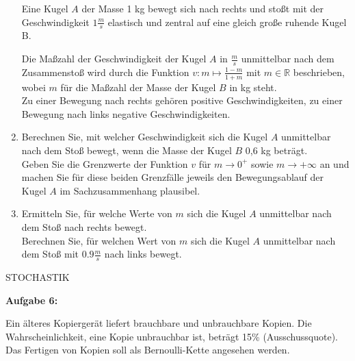 \documentclass[a4paper,12pt]{article}
\newcommand{\Aufgabe}[1]{
  {
  \vspace*{0.5cm}
  \textsf{\textbf{Aufgabe #1}}
  \vspace*{0.2cm}
  
  }
}
\begin{document}
\begin{enumerate}[label={\alph*)}]
Eine Kugel $A$ der Masse 1 kg bewegt sich nach rechts und stoßt mit der Geschwindigkeit $1\frac{m}{s}$ elastisch und zentral auf eine gleich große ruhende Kugel B.


    Die Maßzahl der Geschwindigkeit der Kugel $A$ in $\frac{m}{s}$ unmittelbar nach dem Zusammenstoß wird durch die Funktion $v: m\mapsto \frac{1-m}{1+m}$ mit $m \in \mathbb{R}$ beschrieben, wobei $m$ für die Maßzahl der Masse der Kugel $B$ in kg steht.\\
Zu einer Bewegung nach rechts gehören positive Geschwindigkeiten, zu einer Bewegung nach links negative Geschwindigkeiten.

\item Berechnen Sie, mit welcher Geschwindigkeit sich die Kugel $A$ unmittelbar nach dem Stoß bewegt, wenn die Masse der Kugel $B$ 0,6 kg beträgt.\\
  Geben Sie die Grenzwerte der Funktion $v$ für $m \rightarrow 0^+$ sowie $m \rightarrow +\infty$ an und machen Sie für diese beiden Grenzfälle jeweils den Bewegungsablauf der Kugel $A$ im Sachzusammenhang plausibel.

\item Ermitteln Sie, für welche Werte von $m$ sich die Kugel $A$ unmittelbar nach dem Stoß nach rechts bewegt.\\
  Berechnen Sie, für welchen Wert von $m$ sich die Kugel $A$ unmittelbar nach dem Stoß mit $\num{0,9} \frac{m}{s}$ nach links bewegt.
\end{enumerate}

\newpage

STOCHASTIK

\Aufgabe{6:} 

Ein älteres Kopiergerät liefert brauchbare und unbrauchbare Kopien. Die Wahrscheinlichkeit, eine Kopie unbrauchbar ist, beträgt 15\% (Ausschussquote). Das Fertigen von Kopien soll als Bernoulli-Kette angesehen werden.
\end{document}
